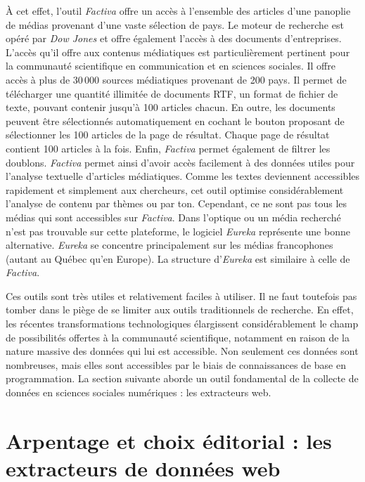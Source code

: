 \documentclass[
  letterpaper,
  DIV=11,
  numbers=noendperiod,
  oneside]{scrreprt}
\begin{document}
À cet effet, l'outil \emph{Factiva} offre un accès à l'ensemble des
articles d'une panoplie de médias provenant d'une vaste sélection de
pays. Le moteur de recherche est opéré par \emph{Dow Jones} et offre
également l'accès à des documents d'entreprises. L'accès qu'il offre aux
contenus médiatiques est particulièrement pertinent pour la communauté
scientifique en communication et en sciences sociales. Il offre accès à
plus de 30\,000 sources médiatiques provenant de 200 pays. Il permet de
télécharger une quantité illimitée de documents RTF, un format de
fichier de texte, pouvant contenir jusqu'à 100 articles chacun. En
outre, les documents peuvent être sélectionnés automatiquement en
cochant le bouton proposant de sélectionner les 100 articles de la page
de résultat. Chaque page de résultat contient 100 articles à la fois.
Enfin, \emph{Factiva} permet également de filtrer les doublons.
\emph{Factiva} permet ainsi d'avoir accès facilement à des données
utiles pour l'analyse textuelle d'articles médiatiques. Comme les textes
deviennent accessibles rapidement et simplement aux chercheurs, cet
outil optimise considérablement l'analyse de contenu par thèmes ou par
ton. Cependant, ce ne sont pas tous les médias qui sont accessibles sur
\emph{Factiva}. Dans l'optique ou un média recherché n'est pas trouvable
sur cette plateforme, le logiciel \emph{Eureka} représente une bonne
alternative. \emph{Eureka} se concentre principalement sur les médias
francophones (autant au Québec qu'en Europe). La structure
d'\emph{Eureka} est similaire à celle de \emph{Factiva}.

Ces outils sont très utiles et relativement faciles à utiliser. Il ne
faut toutefois pas tomber dans le piège de se limiter aux outils
traditionnels de recherche. En effet, les récentes transformations
technologiques élargissent considérablement le champ de possibilités
offertes à la communauté scientifique, notamment en raison de la nature
massive des données qui lui est accessible. Non seulement ces données
sont nombreuses, mais elles sont accessibles par le biais de
connaissances de base en programmation. La section suivante aborde un
outil fondamental de la collecte de données en sciences sociales
numériques : les extracteurs web.

\hypertarget{arpentage-et-choix-uxe9ditorial-les-extracteurs-de-donnuxe9es-web}{%
\section{Arpentage et choix éditorial : les extracteurs de données
web}\label{arpentage-et-choix-uxe9ditorial-les-extracteurs-de-donnuxe9es-web}}
\end{document}
